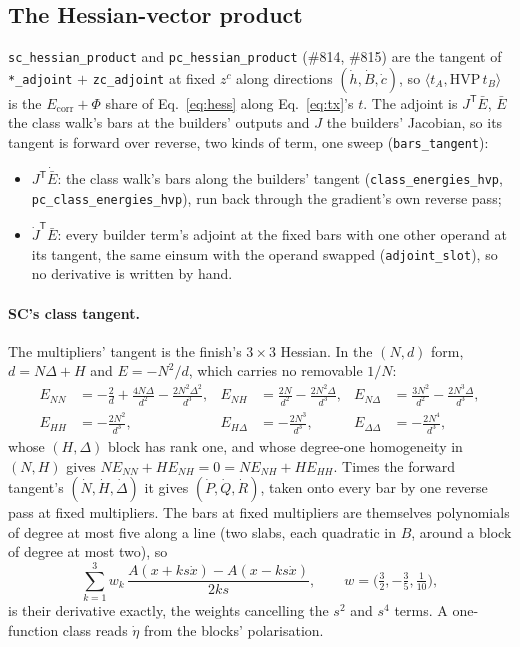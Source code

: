 \documentclass[11pt]{article}
\newcommand{\code}[1]{\texttt{#1}}
\newcommand{\Ecorr}{E_{\mathrm{corr}}}
\newcommand{\T}{\mathsf T}
\begin{document}
\subsection{The Hessian-vector product}
\label{sec:hvp}

\code{sc\_hessian\_product} and \code{pc\_hessian\_product} (\#814, \#815)
are the tangent of \code{*\_adjoint} $+$ \code{zc\_adjoint} at fixed $z^c$
along directions $(\dot h, \dot B, \dot c)$, so $\langle t_A,
\mathrm{HVP}\,t_B\rangle$ is the $\Ecorr + \Phi$ share of
Eq.~\eqref{eq:hess} along Eq.~\eqref{eq:tx}'s $t$. The adjoint is $J^\T\bar E$, $\bar E$
the class walk's bars at the builders' outputs and $J$ the builders'
Jacobian, so its tangent is forward over reverse, two kinds of term, one
sweep (\code{bars\_tangent}):
\begin{itemize}
\item $J^\T\dot{\bar E}$: the class walk's bars along the builders' tangent
  (\code{class\_energies\_hvp}, \code{pc\_class\_energies\_hvp}), run back
  through the gradient's own reverse pass;
\item $\dot J^\T\bar E$: every builder term's adjoint at the fixed bars with
  one other operand at its tangent, the same einsum with the operand swapped
  (\code{adjoint\_slot}), so no derivative is written by hand.
\end{itemize}

\paragraph{SC's class tangent.} The multipliers' tangent is the finish's
$3\times3$ Hessian. In the $(N, d)$ form, $d = N\Delta + H$ and $E = -N^2/d$,
which carries no removable $1/N$:
\begin{equation}
\begin{aligned}
  E_{NN} &= -\frac2d + \frac{4N\Delta}{d^2} - \frac{2N^2\Delta^2}{d^3}, &
  E_{NH} &= \frac{2N}{d^2} - \frac{2N^2\Delta}{d^3}, &
  E_{N\Delta} &= \frac{3N^2}{d^2} - \frac{2N^3\Delta}{d^3},\\
  E_{HH} &= -\frac{2N^2}{d^3}, &
  E_{H\Delta} &= -\frac{2N^3}{d^3}, &
  E_{\Delta\Delta} &= -\frac{2N^4}{d^3},
\end{aligned}
\label{eq:finish}
\end{equation}
whose $(H, \Delta)$ block has rank one, and whose degree-one homogeneity in
$(N, H)$ gives $NE_{NN} + HE_{NH} = 0 = NE_{NH} + HE_{HH}$. Times the forward
tangent's $(\dot N, \dot H, \dot\Delta)$ it gives $(\dot P, \dot Q, \dot R)$,
taken onto every bar by one reverse pass at fixed multipliers. The bars at
fixed multipliers are themselves polynomials of degree at most five along a
line (two slabs, each quadratic in $B$, around a block of degree at most
two), so
\begin{equation}
  \sum_{k=1}^{3} w_k\,\frac{A(x + ks\dot x) - A(x - ks\dot x)}{2ks},\qquad
  w = \bigl(\tfrac32, -\tfrac35, \tfrac1{10}\bigr),
\end{equation}
is their derivative exactly, the weights cancelling the $s^2$ and $s^4$
terms. A one-function class reads $\dot\eta$ from the blocks' polarisation.
\end{document}
